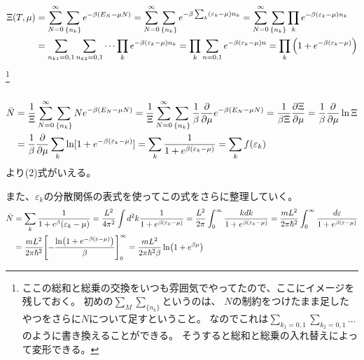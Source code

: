 \documentclass[../../sp_2013.tex]{subfiles}
\begin{document}
\subsection{}
\begin{equation}\begin{aligned}[b]
    \Xi(T,\mu)
    &= \sum_{N=0}^{\infty}\sum_{\{n_k\}}e^{-\beta(E_N-\mu N)}
    = \sum_{N=0}^{\infty}\sum_{\{n_k\}}e^{-\beta\sum_k(\varepsilon_k-\mu)n_k}
    = \sum_{N=0}^{\infty}\sum_{\{n_k\}}\prod_k e^{-\beta(\varepsilon_k-\mu)n_k}\\
    &= \sum_{n_{k1}=0,1}\sum_{n_{k2}=0,1}\cdots \prod_k e^{-\beta(\varepsilon_k-\mu)n_k}
    = \prod_k \sum_{n=0,1}e^{-\beta(\varepsilon_k-\mu)n}
    = \prod_k \qty(1+e^{-\beta(\varepsilon_k-\mu)})
\end{aligned}\end{equation}
\footnote{
    ここの総和と総乗の交換をいつも雰囲気でやってたので、ここにイメージを残しておく。
    初めの\(\sum_M\sum_{\{n_k\}}\)というのは、
    \(N\)の制約をつけたまま足したやつをさらに\(N\)について足すということ。
    なのでこれは\(\sum_{k_1=0,1}\sum_{k_2=0,1}\ldots\)のように書き換えることができる。
    そうすると総和と総乗の入れ替えによって変形できる。
}
\subsection{}
\begin{equation}\begin{aligned}[b]
    \bar{N}
    &= \frac{1}{\Xi}\sum_{N=0}^{\infty}\sum_{\{n_k\}}Ne^{-\beta(E_N-\mu N)}
    = \frac{1}{\Xi}\sum_{N=0}^{\infty}\sum_{\{n_k\}}\frac{1}{\beta}\pdv{\mu}e^{-\beta(E_N-\mu N)}
    = \frac{1}{\beta\Xi}\pdv{\Xi}{\mu}
    = \frac{1}{\beta}\pdv{\mu}\ln\Xi\\
    &=  \frac{1}{\beta}\pdv{\mu}\sum_k\ln[1+e^{-\beta(\varepsilon_k-\mu)}]
    = \sum_k \frac{1}{1+e^{\beta(\varepsilon_k-\mu)}} = \sum_kf(\varepsilon_k)
\end{aligned}\end{equation}
より(2)式がいえる。

また、\(\varepsilon_k\)の分散関係の表式を使ってこの式をさらに整理していく。
\begin{equation}\begin{aligned}[b]
    \bar{N}
    &= \sum_k \frac{1}{1+e^{\beta}(\varepsilon_k-\mu)}
    = \frac{L^2}{4\pi^2}\int d^2k \frac{1}{1+e^{\beta(\varepsilon_k-\mu)}}
    = \frac{L^2}{2\pi}\int_{0}^{\infty} \frac{kdk}{1+e^{\beta(\varepsilon_k-\mu)}}
    = \frac{mL^2}{2\pi\hbar^2}\int_{0}^{\infty} \frac{d\varepsilon}{1+e^{\beta(\varepsilon-\mu)}}\\
    &= \frac{mL^2}{2\pi\hbar^2}\qty[-\frac{\ln(1+e^{-\beta(\varepsilon-\mu)})}{\beta}]_0^{\infty}
    = \frac{mL^2}{2\pi\hbar^2\beta}\ln(1+e^{\beta\mu})
\end{aligned}\end{equation}
\end{document}
